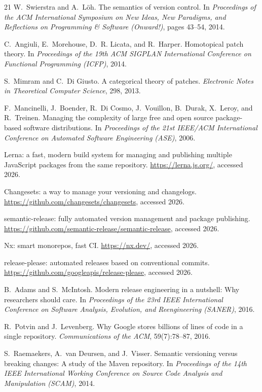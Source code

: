 \documentclass[sigconf,nonacm]{acmart}
\begin{document}
\begin{thebibliography}{21}
W.~Swierstra and A.~L\"oh.
The semantics of version control.
In \emph{Proceedings of the ACM International Symposium on New Ideas,
New Paradigms, and Reflections on Programming \& Software (Onward!)},
pages 43--54, 2014.

C.~Angiuli, E.~Morehouse, D.~R. Licata, and R.~Harper.
Homotopical patch theory.
In \emph{Proceedings of the 19th ACM SIGPLAN International Conference
on Functional Programming (ICFP)}, 2014.

S.~Mimram and C.~Di Giusto.
A categorical theory of patches.
\emph{Electronic Notes in Theoretical Computer Science}, 298, 2013.

F.~Mancinelli, J.~Boender, R.~Di Cosmo, J.~Vouillon, B.~Durak,
X.~Leroy, and R.~Treinen.
Managing the complexity of large free and open source package-based
software distributions.
In \emph{Proceedings of the 21st IEEE/ACM International Conference on
Automated Software Engineering (ASE)}, 2006.

Lerna: a fast, modern build system for managing and publishing multiple
JavaScript packages from the same repository.
\url{https://lerna.js.org/}, accessed 2026.

Changesets: a way to manage your versioning and changelogs.
\url{https://github.com/changesets/changesets}, accessed 2026.

semantic-release: fully automated version management and package
publishing.
\url{https://github.com/semantic-release/semantic-release},
accessed 2026.

Nx: smart monorepos, fast CI.
\url{https://nx.dev/}, accessed 2026.

release-please: automated releases based on conventional commits.
\url{https://github.com/googleapis/release-please}, accessed 2026.

B.~Adams and S.~McIntosh.
Modern release engineering in a nutshell: Why researchers should care.
In \emph{Proceedings of the 23rd IEEE International Conference on
Software Analysis, Evolution, and Reengineering (SANER)}, 2016.

R.~Potvin and J.~Levenberg.
Why Google stores billions of lines of code in a single repository.
\emph{Communications of the ACM}, 59(7):78--87, 2016.

S.~Raemaekers, A.~van Deursen, and J.~Visser.
Semantic versioning versus breaking changes: A study of the Maven
repository.
In \emph{Proceedings of the 14th IEEE International Working Conference
on Source Code Analysis and Manipulation (SCAM)}, 2014.


\end{thebibliography}
\end{document}
